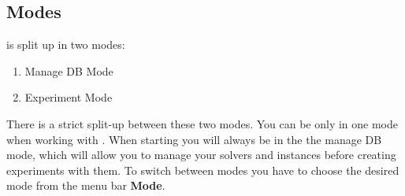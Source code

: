 \subsection{Modes}
\edacc is split up in two modes:
\begin{enumerate}
	\item Manage DB Mode
	\item Experiment Mode
\end{enumerate}
There is a strict split-up between these two modes. You can be only in one mode when working with \edacc.
When starting \edacc you will always be in the the manage DB mode, which will allow you to manage your solvers and instances before creating experiments with them. 
To switch between modes you have to choose the desired mode from the menu bar \textbf{Mode}. 

